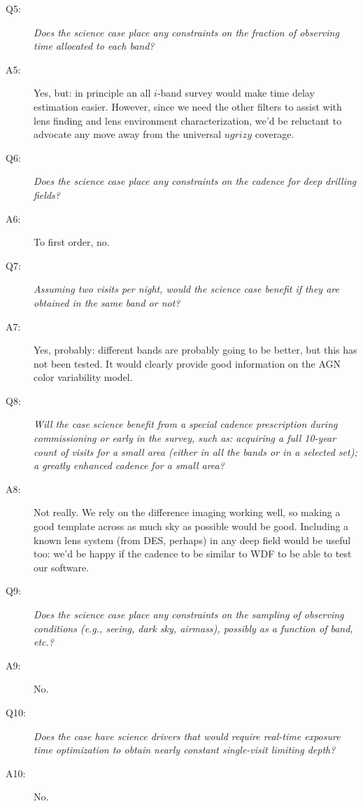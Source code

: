 \begin{description}
\item[Q5:] {\it Does the science case place any constraints on the
fraction of observing time allocated to each band?}

\item[A5:] Yes, but: in principle an all $i$-band survey would make time
delay estimation easier. However, since we need the other filters to
assist with lens finding and lens environment characterization, we'd be
reluctant to advocate any move away from the universal $ugrizy$
coverage.

\item[Q6:] {\it Does the science case place any constraints on the
cadence for deep drilling fields?}

\item[A6:] To first order, no.

\item[Q7:] {\it Assuming two visits per night, would the science case
benefit if they are obtained in the same band or not?}

\item[A7:] Yes, probably: different bands are probably going to be
better, but this has not been tested. It would clearly provide good
information on the AGN color variability model.

\item[Q8:] {\it Will the case science benefit from a special cadence
prescription during commissioning or early in the survey, such as:
acquiring a full 10-year count of visits for a small area (either in all
the bands or in a  selected set); a greatly enhanced cadence for a small
area?}

\item[A8:] Not really. We rely on the difference imaging working well,
so making a good template across as much sky as possible would be good.
Including a known lens system (from DES, perhaps) in any deep field
would be useful too: we'd be happy if the cadence to be similar to WDF
to be able to test our software.

\item[Q9:] {\it Does the science case place any constraints on the
sampling of observing conditions (e.g., seeing, dark sky, airmass),
possibly as a function of band, etc.?}

\item[A9:] No.

\item[Q10:] {\it Does the case have science drivers that would require
real-time exposure time optimization to obtain nearly constant
single-visit limiting depth?}

\item[A10:] No.

\end{description}

\navigationbar

